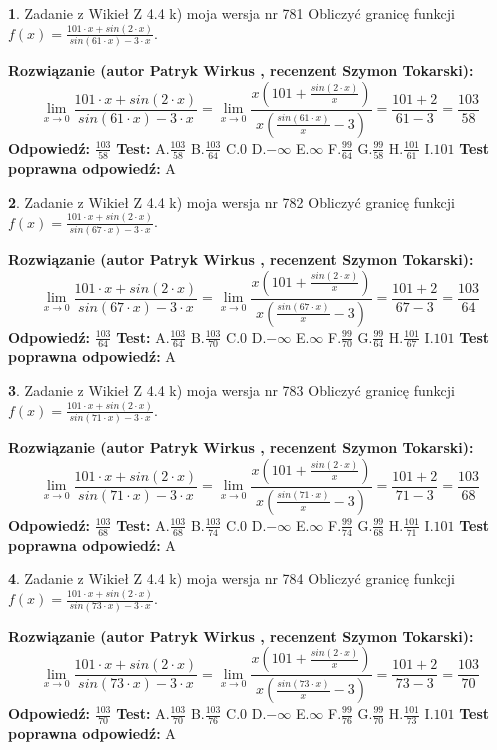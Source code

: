 \documentclass[12pt, a4paper]{article}
\theoremstyle{definition} %
\newtheorem{zad}{}
\newcommand{\zadStart}[1]{\begin{zad}#1\newline}
\newcommand{\zadStop}{\end{zad}}
\newcommand{\rozwStart}[2]{\noindent \textbf{Rozwiązanie (autor #1 , recenzent #2): }\newline}
\newcommand{\rozwStop}{\newline}
\newcommand{\odpStart}{\noindent \textbf{Odpowiedź:}\newline}
\newcommand{\odpStop}{\newline}
\newcommand{\testStart}{\noindent \textbf{Test:}\newline}
\newcommand{\testStop}{\newline}
\newcommand{\kluczStart}{\noindent \textbf{Test poprawna odpowiedź:}\newline}
\newcommand{\kluczStop}{\newline}
\begin{document}
\zadStart{Zadanie z Wikieł Z 4.4 k) moja wersja nr 781}
Obliczyć granicę funkcji $f(x)=\frac{101\cdot x +sin(2\cdot x)}{sin(61\cdot x) -3\cdot x}$.
\zadStop
\rozwStart{Patryk Wirkus}{Szymon Tokarski}
$$\lim\limits_{x\to 0}\frac{101\cdot x +sin(2\cdot x)}{sin(61\cdot x) -3\cdot x}
=\lim\limits_{x\to 0}\frac{x(101+\frac{sin(2\cdot x)}{x})}{x(\frac{sin(61\cdot x)}{x}-3)}
=\frac{101+2}{61-3} = \frac{103}{58}$$
\rozwStop
\odpStart
$\frac{103}{58}$
\odpStop
\testStart
A.$\frac{103}{58}$
B.$\frac{103}{64}$
C.$0$
D.$-\infty$
E.$\infty$
F.$\frac{99}{64}$
G.$\frac{99}{58}$
H.$\frac{101}{61}$
I.$101$
\testStop
\kluczStart
A
\kluczStop



\zadStart{Zadanie z Wikieł Z 4.4 k) moja wersja nr 782}
Obliczyć granicę funkcji $f(x)=\frac{101\cdot x +sin(2\cdot x)}{sin(67\cdot x) -3\cdot x}$.
\zadStop
\rozwStart{Patryk Wirkus}{Szymon Tokarski}
$$\lim\limits_{x\to 0}\frac{101\cdot x +sin(2\cdot x)}{sin(67\cdot x) -3\cdot x}
=\lim\limits_{x\to 0}\frac{x(101+\frac{sin(2\cdot x)}{x})}{x(\frac{sin(67\cdot x)}{x}-3)}
=\frac{101+2}{67-3} = \frac{103}{64}$$
\rozwStop
\odpStart
$\frac{103}{64}$
\odpStop
\testStart
A.$\frac{103}{64}$
B.$\frac{103}{70}$
C.$0$
D.$-\infty$
E.$\infty$
F.$\frac{99}{70}$
G.$\frac{99}{64}$
H.$\frac{101}{67}$
I.$101$
\testStop
\kluczStart
A
\kluczStop



\zadStart{Zadanie z Wikieł Z 4.4 k) moja wersja nr 783}
Obliczyć granicę funkcji $f(x)=\frac{101\cdot x +sin(2\cdot x)}{sin(71\cdot x) -3\cdot x}$.
\zadStop
\rozwStart{Patryk Wirkus}{Szymon Tokarski}
$$\lim\limits_{x\to 0}\frac{101\cdot x +sin(2\cdot x)}{sin(71\cdot x) -3\cdot x}
=\lim\limits_{x\to 0}\frac{x(101+\frac{sin(2\cdot x)}{x})}{x(\frac{sin(71\cdot x)}{x}-3)}
=\frac{101+2}{71-3} = \frac{103}{68}$$
\rozwStop
\odpStart
$\frac{103}{68}$
\odpStop
\testStart
A.$\frac{103}{68}$
B.$\frac{103}{74}$
C.$0$
D.$-\infty$
E.$\infty$
F.$\frac{99}{74}$
G.$\frac{99}{68}$
H.$\frac{101}{71}$
I.$101$
\testStop
\kluczStart
A
\kluczStop



\zadStart{Zadanie z Wikieł Z 4.4 k) moja wersja nr 784}
Obliczyć granicę funkcji $f(x)=\frac{101\cdot x +sin(2\cdot x)}{sin(73\cdot x) -3\cdot x}$.
\zadStop
\rozwStart{Patryk Wirkus}{Szymon Tokarski}
$$\lim\limits_{x\to 0}\frac{101\cdot x +sin(2\cdot x)}{sin(73\cdot x) -3\cdot x}
=\lim\limits_{x\to 0}\frac{x(101+\frac{sin(2\cdot x)}{x})}{x(\frac{sin(73\cdot x)}{x}-3)}
=\frac{101+2}{73-3} = \frac{103}{70}$$
\rozwStop
\odpStart
$\frac{103}{70}$
\odpStop
\testStart
A.$\frac{103}{70}$
B.$\frac{103}{76}$
C.$0$
D.$-\infty$
E.$\infty$
F.$\frac{99}{76}$
G.$\frac{99}{70}$
H.$\frac{101}{73}$
I.$101$
\testStop
\kluczStart
A
\kluczStop
\end{document}
